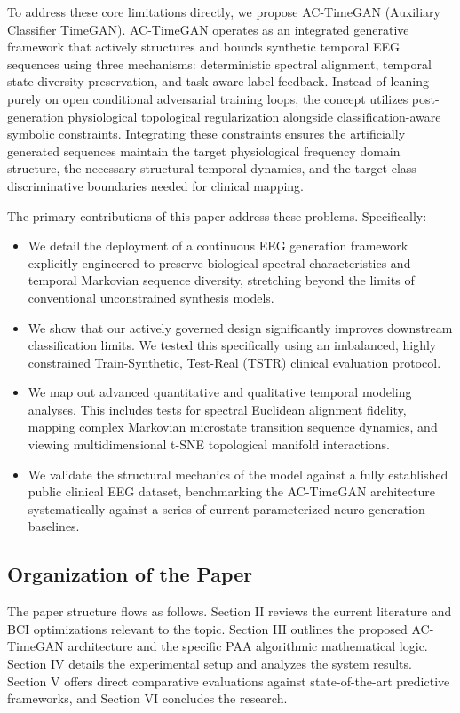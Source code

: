 \documentclass[journal,10pt,twocolumn]{IEEEtran}
\begin{document}
To address these core limitations directly, we propose AC-TimeGAN (Auxiliary Classifier TimeGAN). AC-TimeGAN operates as an integrated generative framework that actively structures and bounds synthetic temporal EEG sequences using three mechanisms: deterministic spectral alignment, temporal state diversity preservation, and task-aware label feedback. Instead of leaning purely on open conditional adversarial training loops, the concept utilizes post-generation physiological topological regularization alongside classification-aware symbolic constraints. Integrating these constraints ensures the artificially generated sequences maintain the target physiological frequency domain structure, the necessary structural temporal dynamics, and the target-class discriminative boundaries needed for clinical mapping.

The primary contributions of this paper address these problems. Specifically:
\begin{itemize}
    \item We detail the deployment of a continuous EEG generation framework explicitly engineered to preserve biological spectral characteristics and temporal Markovian sequence diversity, stretching beyond the limits of conventional unconstrained synthesis models.
    \item We show that our actively governed design significantly improves downstream classification limits. We tested this specifically using an imbalanced, highly constrained Train-Synthetic, Test-Real (TSTR) clinical evaluation protocol.
    \item We map out advanced quantitative and qualitative temporal modeling analyses. This includes tests for spectral Euclidean alignment fidelity, mapping complex Markovian microstate transition sequence dynamics, and viewing multidimensional t-SNE topological manifold interactions.
    \item We validate the structural mechanics of the model against a fully established public clinical EEG dataset, benchmarking the AC-TimeGAN architecture systematically against a series of current parameterized neuro-generation baselines.
\end{itemize}

\subsection{Organization of the Paper}
The paper structure flows as follows. Section II reviews the current literature and BCI optimizations relevant to the topic. Section III outlines the proposed AC-TimeGAN architecture and the specific PAA algorithmic mathematical logic. Section IV details the experimental setup and analyzes the system results. Section V offers direct comparative evaluations against state-of-the-art predictive frameworks, and Section VI concludes the research.
\end{document}
